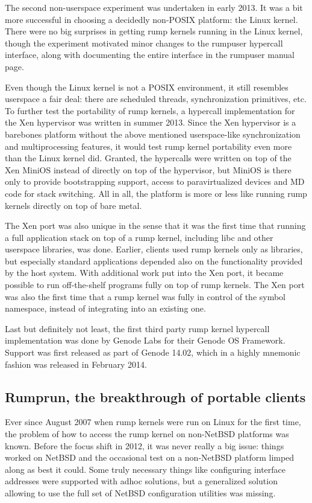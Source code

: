 The second non-userspace experiment was undertaken in early 2013.
It was a bit more successful in choosing a decidedly non-POSIX platform:
the Linux kernel.  There were no big surprises in getting rump kernels
running in the Linux kernel, though the experiment motivated minor changes
to the rumpuser hypercall interface, along with documenting the entire
interface in the rumpuser manual page.

Even though the Linux kernel is not a POSIX environment, it still
resembles userspace a fair deal: there are scheduled threads,
synchronization primitives, etc.  To further test the portability
of rump kernels, a hypercall implementation for the Xen hypervisor
was written in summer 2013.  Since the Xen hypervisor is a barebones
platform without the above mentioned userspace-like synchronization and
multiprocessing features, it would test rump kernel portability even
more than the Linux kernel did.  Granted, the hypercalls were written
on top of the Xen MiniOS instead of directly on top of the hypervisor,
but MiniOS is there only to provide bootstrapping support, access
to paravirtualized devices and MD code for stack switching.  All in all,
the platform is more or less like running rump kernels directly on top
of bare metal.

The Xen port was also unique in the sense that it was the first time
that running a full application stack on top of a rump kernel, including
libc and other userspace libraries, was done.  Earlier, clients used rump
kernels only as libraries, but especially standard applications depended
also on the functionality provided by the host system.  With additional
work put into the Xen port, it became possible to run off-the-shelf
programs fully on top of rump kernels.  The Xen port was also the first
time that a rump kernel was fully in control of the symbol namespace,
instead of integrating into an existing one.

Last but definitely not least, the first third party rump kernel hypercall
implementation was done by Genode Labs for their Genode OS Framework.
Support was first released as part of Genode 14.02, which in a highly
mnemonic fashion was released in February 2014.


\subsection{Rumprun, the breakthrough of portable clients}

Ever since August 2007 when rump kernels were run on Linux for the first
time, the problem of how to access the rump kernel on non-NetBSD platforms
was known.  Before the focus shift in 2012, it was never really a big
issue: things worked on NetBSD and the occasional test on a non-NetBSD
platform limped along as best it could.  Some truly necessary things like
configuring interface addresses were supported with adhoc solutions,
but a generalized solution allowing to use the full set of NetBSD
configuration utilities was missing.

